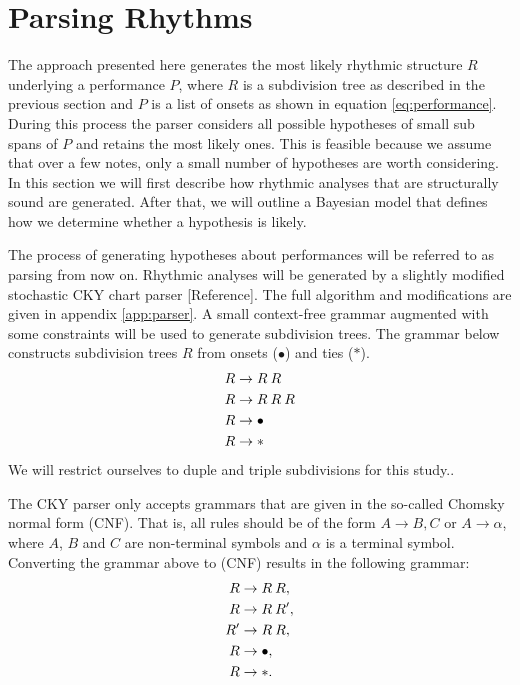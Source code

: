 \section{Parsing Rhythms}

The approach presented here generates the most likely rhythmic structure $R$ underlying a performance $P$, where $R$ is a subdivision tree as described in the previous section and $P$ is a list of onsets as shown in equation \ref{eq:performance}. During this process the parser considers all possible hypotheses of small sub spans of $P$ and retains the most likely ones. This is feasible because we assume that over a few notes, only a small number of hypotheses are worth considering. In this section we will first describe how rhythmic analyses that are structurally sound are generated. After that, we will outline a Bayesian model that defines how we determine whether a hypothesis is likely.

The process of generating hypotheses about performances will be referred to as parsing from now on. Rhythmic analyses will be generated by a slightly modified stochastic CKY chart parser [Reference]. The full algorithm and modifications are given in appendix \ref{app:parser}. A small context-free grammar augmented with some constraints will be used to generate subdivision trees. The grammar below constructs subdivision trees $R$ from onsets ($\bullet$) and ties ($*$).
\begin{align}
R &\rightarrow R\: R\\ \notag
R &\rightarrow R\: R\: R\\ \notag
R &\rightarrow \bullet\\ \notag
R &\rightarrow * \notag
\end{align}
We will restrict ourselves to duple and triple subdivisions for this study..

The CKY parser only accepts grammars that are given in the so-called Chomsky normal form (CNF). That is, all rules should be of the form $A \rightarrow B, C$ or $A \rightarrow \alpha$, where $A$, $B$ and $C$ are non-terminal symbols and $\alpha$ is a terminal symbol. Converting the grammar above to (CNF) results in the following grammar:
\begin{align}
\label{eq:grammar_cnf}
R &\rightarrow R\: R,\\ \notag
R &\rightarrow R\: R',\\ \notag
R' &\rightarrow R\: R,\\ \notag
R &\rightarrow \bullet,\\ \notag
R &\rightarrow *. \notag
\end{align}

